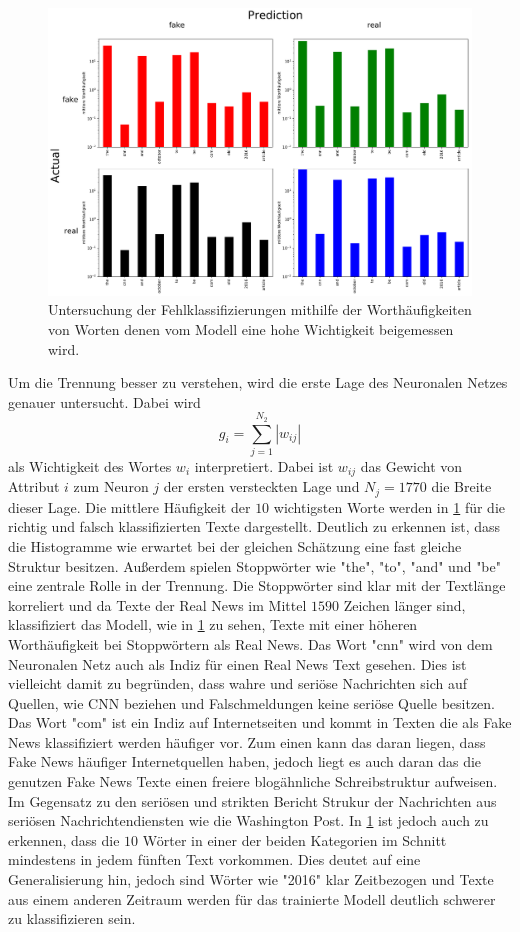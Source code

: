 \begin{figure}
    \centering
    \includegraphics[width=\textwidth]{pictures/cnfn_hist.pdf}
    \caption{Untersuchung der Fehlklassifizierungen mithilfe der Worthäufigkeiten von Worten denen vom 
            Modell eine hohe Wichtigkeit beigemessen wird.}
    \label{fig:CM_i}
\end{figure}
Um die Trennung besser zu verstehen, wird die erste Lage des Neuronalen Netzes genauer untersucht.
Dabei wird
\begin{equation}
    g_i = \sum_{j=1}^{N_2}|w_{ij}|
\end{equation}
als Wichtigkeit des Wortes $w_i$ interpretiert. Dabei ist $w_{ij}$ das Gewicht von Attribut $i$ zum Neuron $j$ der 
ersten versteckten Lage und $N_j=1770$ die Breite dieser Lage.
Die mittlere Häufigkeit der $10$ wichtigsten Worte werden in \ref{fig:CM_i} für die richtig und falsch klassifizierten 
Texte dargestellt.
Deutlich zu erkennen ist, dass die Histogramme wie erwartet bei der gleichen Schätzung eine fast gleiche Struktur besitzen.
Außerdem spielen Stoppwörter wie "the", "to", "and" und "be" eine zentrale Rolle in der Trennung.
Die Stoppwörter sind klar mit der Textlänge korreliert und da Texte der Real News im Mittel $\num{1590}$ Zeichen 
länger sind, klassifiziert das Modell, wie in \ref{fig:CM_i} zu sehen, Texte mit einer höheren Worthäufigkeit bei Stoppwörtern 
als Real News.
Das Wort "cnn" wird von dem Neuronalen Netz auch als Indiz für einen Real News Text gesehen.
Dies ist vielleicht damit zu begründen, dass wahre und seriöse Nachrichten sich auf Quellen, wie CNN beziehen und 
Falschmeldungen keine seriöse Quelle besitzen.
Das Wort "com" ist ein Indiz auf Internetseiten und kommt in Texten die als Fake News klassifiziert werden häufiger 
vor.
Zum einen kann das daran liegen, dass Fake News häufiger Internetquellen haben, jedoch liegt es auch daran das die 
genutzen Fake News Texte einen freiere blogähnliche Schreibstruktur aufweisen. 
Im Gegensatz zu den seriösen und strikten Bericht Strukur der Nachrichten aus seriösen Nachrichtendiensten wie die 
Washington Post.
In \ref{fig:CM_i} ist jedoch auch zu erkennen, dass die $10$ Wörter in einer der beiden Kategorien im Schnitt mindestens in 
jedem fünften Text vorkommen. 
Dies deutet auf eine Generalisierung hin, jedoch sind Wörter wie "2016" klar Zeitbezogen und Texte aus einem anderen 
Zeitraum werden für das trainierte Modell deutlich schwerer zu klassifizieren sein. 


